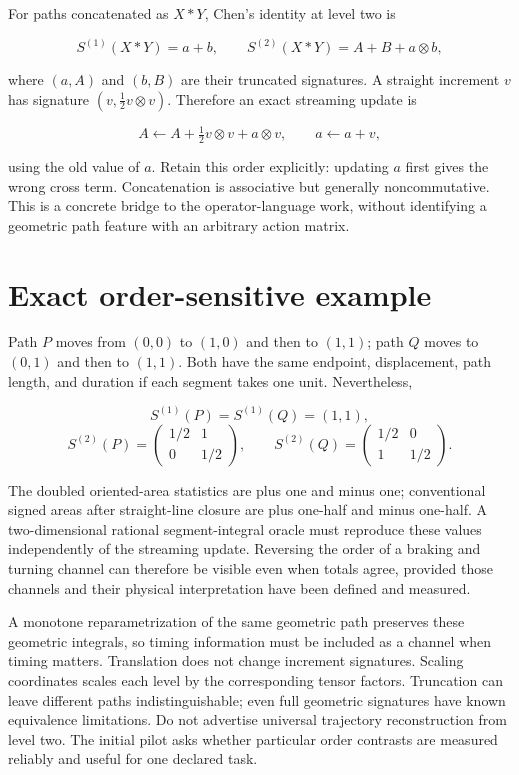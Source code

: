\documentclass[
  11pt,
  a4paper,
]{report}
\begin{document}
For paths concatenated as \(X*Y\), Chen's identity at level two is

\[
 S^{(1)}(X*Y)=a+b,\qquad
 S^{(2)}(X*Y)=A+B+a\otimes b,
\]

where \((a,A)\) and \((b,B)\) are their truncated signatures. A straight
increment \(v\) has signature \((v,\tfrac12v\otimes v)\). Therefore an
exact streaming update is

\[
 A\leftarrow A+\tfrac12v\otimes v+a\otimes v,
 \qquad a\leftarrow a+v,
\]

using the old value of \(a\). Retain this order explicitly: updating
\(a\) first gives the wrong cross term. Concatenation is associative but
generally noncommutative. This is a concrete bridge to the
operator-language work, without identifying a geometric path feature
with an arbitrary action matrix.

\hypertarget{exact-order-sensitive-example}{%
\section{Exact order-sensitive
example}\label{exact-order-sensitive-example}}

Path \(P\) moves from \((0,0)\) to \((1,0)\) and then to \((1,1)\); path
\(Q\) moves to \((0,1)\) and then to \((1,1)\). Both have the same
endpoint, displacement, path length, and duration if each segment takes
one unit. Nevertheless,

\[
 S^{(1)}(P)=S^{(1)}(Q)=(1,1),
\] \[
 S^{(2)}(P)=\begin{pmatrix}1/2&1\\0&1/2\end{pmatrix},\qquad
 S^{(2)}(Q)=\begin{pmatrix}1/2&0\\1&1/2\end{pmatrix}.
\]

The doubled oriented-area statistics are plus one and minus one;
conventional signed areas after straight-line closure are plus one-half
and minus one-half. A two-dimensional rational segment-integral oracle
must reproduce these values independently of the streaming update.
Reversing the order of a braking and turning channel can therefore be
visible even when totals agree, provided those channels and their
physical interpretation have been defined and measured.

A monotone reparametrization of the same geometric path preserves these
geometric integrals, so timing information must be included as a channel
when timing matters. Translation does not change increment signatures.
Scaling coordinates scales each level by the corresponding tensor
factors. Truncation can leave different paths indistinguishable; even
full geometric signatures have known equivalence limitations. Do not
advertise universal trajectory reconstruction from level two. The
initial pilot asks whether particular order contrasts are measured
reliably and useful for one declared task.
\end{document}
